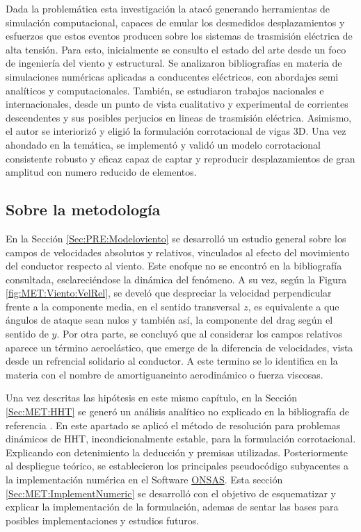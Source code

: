 Dada la problemática esta investigación la atacó  generando herramientas de simulación computacional, capaces de emular los desmedidos desplazamientos y esfuerzos que estos eventos producen sobre los sistemas de trasmisión eléctrica de alta tensión. Para esto, inicialmente se consulto el estado del arte desde un foco de ingeniería del viento y estructural. Se analizaron bibliografías en materia de simulaciones numéricas aplicadas a conducentes eléctricos, con abordajes semi analíticos y computacionales. También, se estudiaron trabajos nacionales e internacionales, desde un punto de vista cualitativo y experimental de corrientes descendentes y sus posibles perjucios en lineas de trasmisión eléctrica.  Asimismo, el autor se interiorizó y eligió la formulación corrotacional de vigas 3D. Una vez ahondado en la temática, se implementó y validó un modelo corrotacional consistente robusto y eficaz capaz de captar y reproducir desplazamientos de gran amplitud con numero reducido de elementos.

\subsection{Sobre la metodología}
En la Sección \ref{Sec:PRE:Modeloviento} se desarrolló un estudio general sobre los campos de velocidades absolutos y relativos, vinculados al efecto del movimiento del conductor respecto al viento. Este enofque no se encontró en la bibliografía consultada, esclareciéndose la dinámica del fenómeno. A su vez, según la Figura \ref{fig:MET:Viento:VelRel}, se develó que despreciar la velocidad perpendicular frente a la componente media, en el sentido transversal $z$,  es equivalente a que ángulos de ataque sean nulos y también así, la componente del drag según el sentido de $y$. Por otra parte, se concluyó que al considerar los campos relativos aparece un término aeroelástico, que emerge de la diferencia de velocidades, vista desde un refrencial solidario al conductor. A este termino se lo identifica en la materia con el nombre de amortiguaneinto aerodinámico o fuerza viscosas. 

Una vez descritas las hipótesis en este mismo capítulo, en la Sección \ref{Sec:MET:HHT} se generó un análisis analítico no explicado en la bibliografía de referencia \citep{Le2014}. En este apartado se aplicó el método de resolución para problemas dinámicos de HHT, incondicionalmente estable, para la formulación corrotacional. Explicando con detenimiento la deducción y premisas utilizadas. Posteriormente al despliegue teórico, se establecieron los principales pseudocódigo subyacentes a la implementación numérica en el Software \href{https://github.com/ONSAS/ONSAS/}{ONSAS}. Esta sección \ref{Sec:MET:ImplementNumeric} se desarrolló con el objetivo de esquematizar y explicar la implementación de la formulación, ademas de sentar las bases para posibles implementaciones y estudios futuros. 

